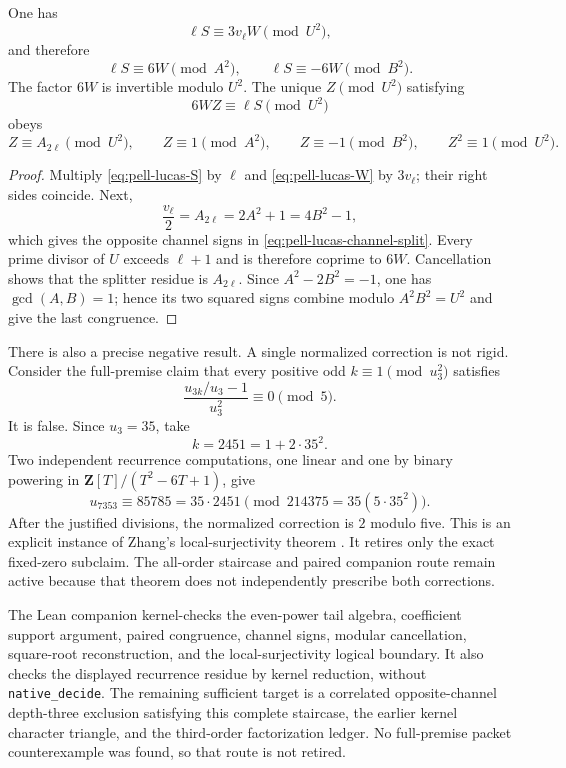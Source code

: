 \begin{theorem}
\label{thm:pell-lucas-companion-splitter}
One has
\begin{equation}\label{eq:pell-lucas-paired-correction}
                  \ell S\equiv3v_\ell W\pmod{U^2},
\end{equation}
and therefore
\begin{equation}\label{eq:pell-lucas-channel-split}
 \ell S\equiv6W\pmod{A^2},
 \qquad
 \ell S\equiv-6W\pmod{B^2}.
\end{equation}
The factor $6W$ is invertible modulo $U^2$.  The unique $Z\pmod{U^2}$
satisfying
\[
                         6WZ\equiv\ell S\pmod{U^2}
\]
obeys
\[
 Z\equiv A_{2\ell}\pmod{U^2},\qquad
 Z\equiv1\pmod{A^2},\qquad Z\equiv-1\pmod{B^2},
 \qquad Z^2\equiv1\pmod{U^2}.
\]
\end{theorem}

\begin{proof}
Multiply \eqref{eq:pell-lucas-S} by $\ell$ and
\eqref{eq:pell-lucas-W} by $3v_\ell$; their right sides coincide.  Next,
\[
 \frac{v_\ell}{2}=A_{2\ell}=2A^2+1=4B^2-1,
\]
which gives the opposite channel signs in
\eqref{eq:pell-lucas-channel-split}.  Every prime divisor of $U$ exceeds
$\ell+1$ and is therefore coprime to $6W$.  Cancellation shows that the
splitter residue is $A_{2\ell}$.  Since $A^2-2B^2=-1$, one has
$\gcd(A,B)=1$; hence its two squared signs combine modulo
$A^2B^2=U^2$ and give the last congruence.
\end{proof}

There is also a precise negative result.  A single normalized correction is
not rigid.  Consider the full-premise claim that every positive odd
$k\equiv1\pmod{u_3^2}$ satisfies
\[
              \frac{u_{3k}/u_3-1}{u_3^2}\equiv0\pmod5.
\]
It is false.  Since $u_3=35$, take
\[
                         k=2451=1+2\cdot35^2.
\]
Two independent recurrence computations, one linear and one by binary
powering in $\mathbf Z[T]/(T^2-6T+1)$, give
\[
 u_{7353}\equiv85785=35\cdot2451
       \pmod{214375=35(5\cdot35^2)}.
\]
After the justified divisions, the normalized correction is $2$ modulo
five.  This is an explicit instance of Zhang's local-surjectivity theorem
\cite[Theorem~5.6]{ZhangLucas2026}.  It retires only the exact fixed-zero
subclaim.  The all-order staircase and paired companion route remain
active because that theorem does not independently prescribe both
corrections.

The Lean companion kernel-checks the even-power tail algebra, coefficient
support argument, paired congruence, channel signs, modular cancellation,
square-root reconstruction, and the local-surjectivity logical boundary.
It also checks the displayed recurrence residue by kernel reduction, without
\texttt{native\_decide}.  The remaining sufficient target is a correlated
opposite-channel depth-three exclusion satisfying this complete staircase,
the earlier kernel character triangle, and the third-order factorization
ledger.  No full-premise packet counterexample was found, so that route is
not retired.
